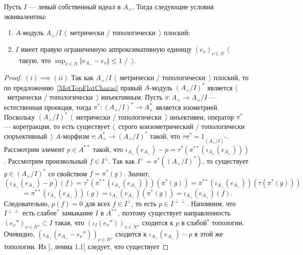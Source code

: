 \begin{proposition}\label{MetTopFlatCycModCharac} Пусть $I$ --- левый
собственный идеал в $A_\times $. Тогда следующие условия эквивалентны:
\begin{enumerate}[label = (\roman*)]
    \item $A$-модуль $A_\times /I$ $\langle$~метрически /
    топологически~$\rangle$ плоский;

    \item $I$ имеет правую ограниченную аппроксимативную единицу
    ${(e_\nu)}_{\nu\in N}$ $\langle$~такую, что 
    $\sup_{\nu\in N}\Vert 
        e_{A_\times}-e_\nu
    \Vert\leq 1$ /~$\rangle$.
\end{enumerate}
\end{proposition}
\begin{proof} $(i) \implies(ii)$  Так как $A_\times /I$ $\langle$~метрически /
топологически~$\rangle$ плоский, то по предложению~\ref{MetTopFlatCharac} правый
$A$-модуль ${(A_\times /I)}^*$ является $\langle$~метрически /
топологически~$\rangle$ инъективным. Пусть $\pi:A_\times \to A_\times /I$ ---
естественная проекция, тогда $\pi^*:{(A_\times /I)}^*\to A_\times ^*$ является
изометрией. Поскольку ${(A_\times /I)}^*$ $\langle$~метрически /
топологически~$\rangle$ инъективен, оператор $\pi^*$ --- коретракция, то есть
существует $\langle$~строго коизометрический / топологически
сюръективный~$\rangle$ $A$-морфизм $\tau:A_\times ^*\to {(A_\times /I)}^*$ такой,
что $\tau\pi^*=1_{{(A_\times /I)}^*}$. Рассмотрим элемент $p\in A^{**}$ такой, что
$\iota_{A_\times }(e_{A_\times })-p=\tau^*(\pi^{**}(\iota_{A_\times
}(e_{A_\times })))$. Рассмотрим произвольный $f\in I^\perp$. Так как
$I^\perp=\pi^*({(A_\times /I)}^*)$, то существует $g\in {(A_\times /I)}^*$ со
свойством $f=\pi^*(g)$. Значит,
$$
(\iota_{A_\times }(e_{A_\times })-p)(f)
=\tau^*(\pi^{**}(\iota_{A_\times }(e_{A_\times })))(\pi^*(g))
=\pi^{**}(\iota_{A_\times }(e_{A_\times }))(\tau(\pi^*(g)))
$$
$$
=\pi^{**}(\iota_{A_\times }(e_{A_\times }))(g)
=\iota_{A_\times }(e_{A_\times })(\pi^*(g))
=\iota_{A_\times }(e_{A_\times })(f).
$$
Следовательно, $p(f)=0$ для всех $f\in I^\perp$, то есть $p\in I^{\perp\perp}$.
Напомним, что $I^{\perp\perp}$ есть слабое${}^*$ замыкание $I$ в $A^{**}$,
поэтому существует направленность ${(e_\nu'')}_{\nu\in N''}\subset I$ такая, что
${(\iota_I(e_\nu''))}_{\nu\in N''}$ сходится к $p$ в слабой${}^*$ топологии.
Очевидно, ${(\iota_{A_\times }(e_{A_\times }-e_\nu''))}_{\nu\in N''}$ сходится к
$\iota_{A_\times }(e_{A_\times })-p$ в этой же топологии. Из
[\cite{PosAndApproxIdinBanAlg}, лемма 1.1] следует, что существует

\end{proof}
